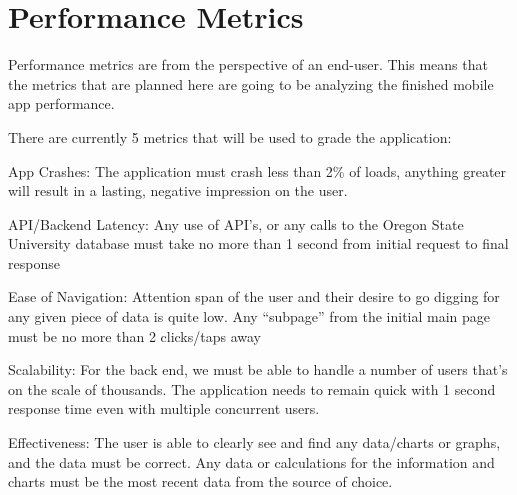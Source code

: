 \documentclass[onecolumn, draftclsnofoot,10pt, compsoc]{IEEEtran}
\begin{document}
\section{Performance Metrics}
Performance metrics are from the perspective of an end-user. This means that the metrics that are planned here are  going to be analyzing the finished mobile app performance. 

There are currently 5 metrics that will be used to grade the application:

	App Crashes:  The application must crash less than 2\% of loads, anything greater will result in a lasting, negative impression on the user.
	
	API/Backend Latency:  Any use of API’s, or any calls to the Oregon State University database must take no more than 1 second from initial request to final response
	
	Ease of Navigation: Attention span of the user and their desire to go digging for any given piece of data is quite low. Any “subpage” from the initial main page must be no 	more than 2 clicks/taps away
	
	Scalability: For the back end, we must be able to handle a number of users that's on the scale of thousands. The application needs to remain quick with 1 second response 	time even with multiple concurrent users. 
	
	Effectiveness:  The user is able to clearly see and find any data/charts or graphs, and the data must be correct. Any data or calculations for the information and charts 	must be the most recent data from the source of choice.
	
\end{document}
